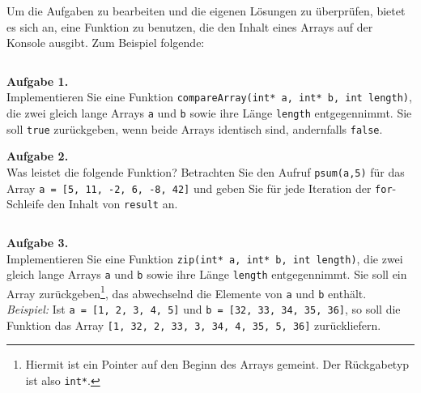 \newcommand{\setfontsize}{11pt}

\lofoot{}


Um die Aufgaben zu bearbeiten und die eigenen Lösungen zu überprüfen, bietet es sich an, eine Funktion zu benutzen, die den Inhalt eines Arrays auf der Konsole ausgibt.
Zum Beispiel folgende:

\inputminted{cpp}{printArray.cpp}

\textbf{Aufgabe 1.} \\
Implementieren Sie eine Funktion \texttt{compareArray(int* a, int* b, int length)}, die zwei gleich lange Arrays \texttt{a} und \texttt{b} sowie ihre Länge \texttt{length} entgegennimmt.
Sie soll \texttt{true} zurückgeben, wenn beide Arrays identisch sind, andernfalls \texttt{false}.

\textbf{Aufgabe 2.} \\
Was leistet die folgende Funktion?
Betrachten Sie den Aufruf \texttt{psum(a,5)} für das Array \texttt{a = [5, 11, -2, 6, -8, 42]} und geben Sie für jede Iteration der \texttt{for}-Schleife den Inhalt von \texttt{result} an.

\inputminted{cpp}{psum.cpp}

\textbf{Aufgabe 3.} \\
Implementieren Sie eine Funktion \texttt{zip(int* a, int* b, int length)}, die zwei gleich lange Arrays \texttt{a} und \texttt{b} sowie ihre Länge \texttt{length} entgegennimmt.
Sie soll ein Array zurückgeben\footnote{Hiermit ist ein Pointer auf den Beginn des Arrays gemeint. Der Rückgabetyp ist also \texttt{int*}.}, das abwechselnd die Elemente von \texttt{a} und \texttt{b} enthält. \\
\textit{Beispiel:} Ist \texttt{a = [1, 2, 3, 4, 5]} und \texttt{b = [32, 33, 34, 35, 36]}, so soll die Funktion das Array \linebreak \texttt{[1, 32, 2, 33, 3, 34, 4, 35, 5, 36]} zurückliefern.

